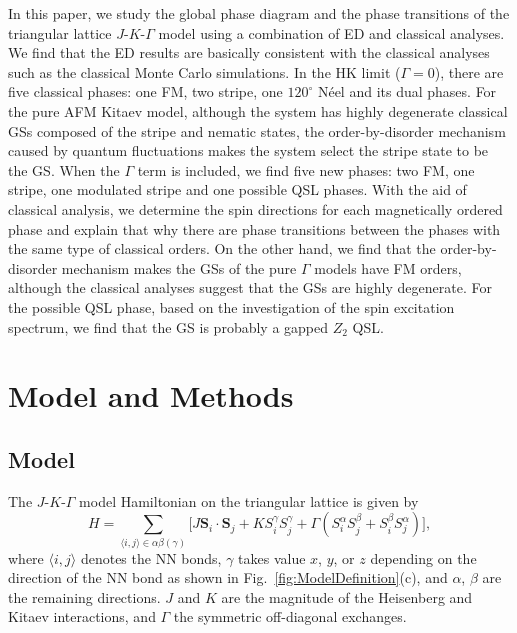 \documentclass[aps,prb,reprint,amsfonts,amsmath,amssymb,showpacs,groupedaddress,superscriptaddress]{revtex4-1}
\begin{document}
In this paper, we study the global phase diagram and the phase transitions of the triangular lattice $J$-$K$-$\Gamma$ model using a combination of ED and classical analyses. We find that the ED results are basically consistent with the classical analyses such as the classical Monte Carlo simulations. In the HK limit ($\Gamma=0$), there are five classical phases: one FM, two stripe, one $120^{\circ}$ N\'{e}el and its dual phases. For the pure AFM Kitaev model, although the system has highly degenerate classical GSs composed of the stripe and nematic states, the order-by-disorder mechanism caused by quantum fluctuations makes the system select the stripe state to be the GS. When the $\Gamma$ term is included, we find five new phases: two FM, one stripe, one modulated stripe and one possible QSL phases. With the aid of classical analysis, we determine the spin directions for each magnetically ordered phase and explain that why there are phase transitions between the phases with the same type of classical orders. On the other hand, we find that the order-by-disorder mechanism makes the GSs of the pure $\Gamma$ models have FM orders, although the classical analyses suggest that the GSs are highly degenerate. For the possible QSL phase, based on the investigation of the spin excitation spectrum, we find that the GS is probably a gapped $Z_{2}$ QSL.


\section{Model and Methods}

\subsection{\label{sec:Model}Model}

The $J$-$K$-$\Gamma$ model Hamiltonian on the triangular lattice is given by
\begin{equation}
    H = \sum_{\langle i,j \rangle \in \alpha \beta (\gamma)} \lbrack J \bm{S}_i \cdot \bm{S}_j + K S_i^{\gamma} S_j^{\gamma} + \Gamma (S_i^{\alpha} S_j^{\beta} + S_i^{\beta} S_j^{\alpha}) \rbrack,
    \label{eq:Hamiltonian}
\end{equation}
where $\langle i,j \rangle$ denotes the NN bonds, $\gamma$ takes value $x$, $y$, or $z$ depending on the direction of the NN bond as shown in Fig.~\ref{fig:ModelDefinition}(c), and $\alpha$, $\beta$ are the remaining directions. $J$ and $K$ are the magnitude of the Heisenberg and Kitaev interactions, and $\Gamma$ the symmetric off-diagonal exchanges.
\end{document}
